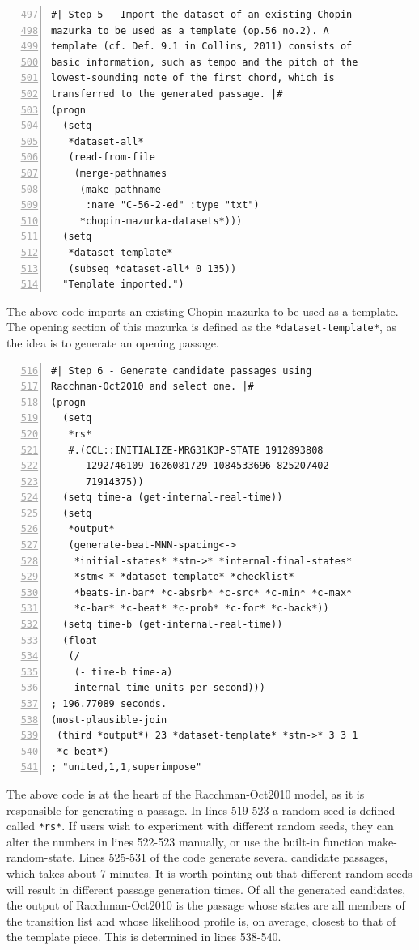 \begin{Verbatim}[frame=single,numbers=left,firstnumber=497]
#| Step 5 - Import the dataset of an existing Chopin
mazurka to be used as a template (op.56 no.2). A
template (cf. Def. 9.1 in Collins, 2011) consists of
basic information, such as tempo and the pitch of the
lowest-sounding note of the first chord, which is
transferred to the generated passage. |#
(progn
  (setq
   *dataset-all*
   (read-from-file
    (merge-pathnames
     (make-pathname
      :name "C-56-2-ed" :type "txt")
     *chopin-mazurka-datasets*)))
  (setq
   *dataset-template*
   (subseq *dataset-all* 0 135))
  "Template imported.")
\end{Verbatim}
The above code imports an existing Chopin mazurka to be used as a template. The opening section of this mazurka is defined as the \texttt{*dataset-template*}, as the idea is to generate an opening passage.

\begin{Verbatim}[frame=single,numbers=left,firstnumber=516]
#| Step 6 - Generate candidate passages using
Racchman-Oct2010 and select one. |#
(progn
  (setq
   *rs*
   #.(CCL::INITIALIZE-MRG31K3P-STATE 1912893808
      1292746109 1626081729 1084533696 825207402
      71914375))
  (setq time-a (get-internal-real-time))
  (setq
   *output*
   (generate-beat-MNN-spacing<->
    *initial-states* *stm->* *internal-final-states*
    *stm<-* *dataset-template* *checklist*
    *beats-in-bar* *c-absrb* *c-src* *c-min* *c-max*
    *c-bar* *c-beat* *c-prob* *c-for* *c-back*))
  (setq time-b (get-internal-real-time))
  (float
   (/
    (- time-b time-a)
    internal-time-units-per-second)))
; 196.77089 seconds.
(most-plausible-join
 (third *output*) 23 *dataset-template* *stm->* 3 3 1
 *c-beat*)
; "united,1,1,superimpose"
\end{Verbatim}
The above code is at the heart of the Racchman-Oct2010 model, as it is responsible for generating a passage. In lines 519-523 a random seed is defined called \texttt{*rs*}. If users wish to experiment with different random seeds, they can alter the numbers in lines 522-523 manually, or use the built-in function make-random-state. Lines 525-531 of the code generate several candidate passages, which takes about 7 minutes. It is worth pointing out that different random seeds will result in different passage generation times. Of all the generated candidates, the output of Racchman-Oct2010 is the passage whose states are all members of the transition list and whose
likelihood profile is, on average, closest to that of
the template piece. This is determined in lines 538-540.

